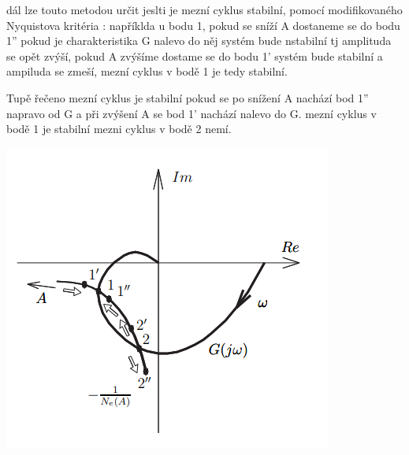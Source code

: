 dál lze touto metodou určit jeslti je mezní cyklus stabilní, pomocí modifikovaného Nyquistova kritéria :
 napříklda u bodu 1, pokud se sníží A dostaneme se do bodu 1'' pokud je charakteristika G nalevo do něj systém bude nstabilní tj amplituda se opět zvýší, pokud A zvýšíme dostame se do bodu 1' systém bude stabilní a ampiluda se zmeší, mezní cyklus v bodě 1 je tedy stabilní.

 Tupě řečeno mezní cyklus je stabilní pokud se po snížení A nachází bod 1'' napravo od G a při zvýšení A se bod 1' nachází nalevo do G.
 mezní cyklus v bodě 1 je stabilní mezni cyklus v bodě 2 nemí.
 
 \includegraphics{img/stab.mez.cyklu.png}